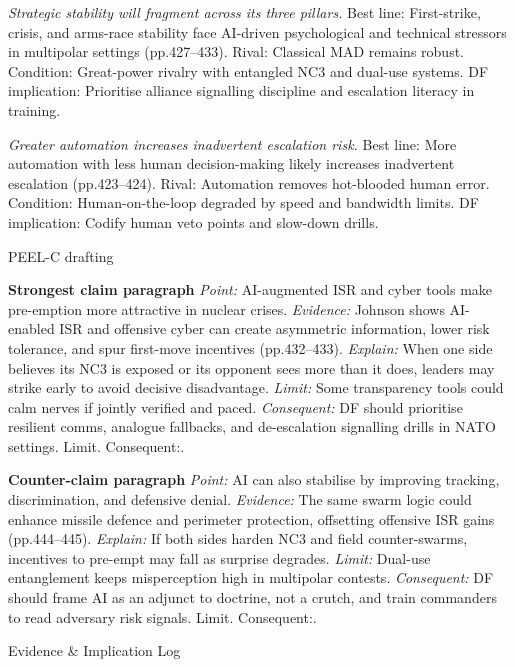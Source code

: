 \textit{Strategic stability will fragment across its three pillars.} Best line: First-strike, crisis, and arms-race stability face AI-driven psychological and technical stressors in multipolar settings (pp.427–433). Rival: Classical MAD remains robust. Condition: Great-power rivalry with entangled NC3 and dual-use systems. DF implication: Prioritise alliance signalling discipline and escalation literacy in training.

\textit{Greater automation increases inadvertent escalation risk.} Best line: More automation with less human decision-making likely increases inadvertent escalation (pp.423–424). Rival: Automation removes hot-blooded human error. Condition: Human-on-the-loop degraded by speed and bandwidth limits. DF implication: Codify human veto points and slow-down drills.

PEEL-C drafting

\textbf{Strongest claim paragraph}
\textit{Point:} AI-augmented ISR and cyber tools make pre-emption more attractive in nuclear crises.
\textit{Evidence:} Johnson shows AI-enabled ISR and offensive cyber can create asymmetric information, lower risk tolerance, and spur first-move incentives (pp.432–433).
\textit{Explain:} When one side believes its NC3 is exposed or its opponent sees more than it does, leaders may strike early to avoid decisive disadvantage.
\textit{Limit:} Some transparency tools could calm nerves if jointly verified and paced.
\textit{Consequent:} DF should prioritise resilient comms, analogue fallbacks, and de-escalation signalling drills in NATO settings. Limit. Consequent:.

\textbf{Counter-claim paragraph}
\textit{Point:} AI can also stabilise by improving tracking, discrimination, and defensive denial.
\textit{Evidence:} The same swarm logic could enhance missile defence and perimeter protection, offsetting offensive ISR gains (pp.444–445).
\textit{Explain:} If both sides harden NC3 and field counter-swarms, incentives to pre-empt may fall as surprise degrades.
\textit{Limit:} Dual-use entanglement keeps misperception high in multipolar contests.
\textit{Consequent:} DF should frame AI as an adjunct to doctrine, not a crutch, and train commanders to read adversary risk signals. Limit. Consequent:.

Evidence & Implication Log

